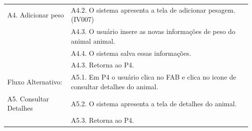 \documentclass[12pt]{article}
\begin{document}
\begin{titlepage}
\begin{center}
\begin{tabular}{ | l |  p{10cm} |}
    A4. Adicionar peso         & A4.2. O sistema apresenta a tela de adicionar pesagem. (IV007) \\
			       & A4.3. O usuário insere as novas informações de peso do animal animal. \\
                               & A4.4. O sistema salva essas informações. \\
			       & A4.3. Retorna ao P4. \\ \hline
    Fluxo Alternativo:         & A5.1. Em P4 o usuário clica no FAB e clica no icone de consultar detalhes do animal. \\
    A5. Consultar Detalhes     & A5.2. O sistema apresenta a tela de detalhes do animal. \\
			       & A5.3. Retorna ao P4. \\
    \hline
  \end{tabular}
\end{center}



\end{titlepage}
\end{document}
